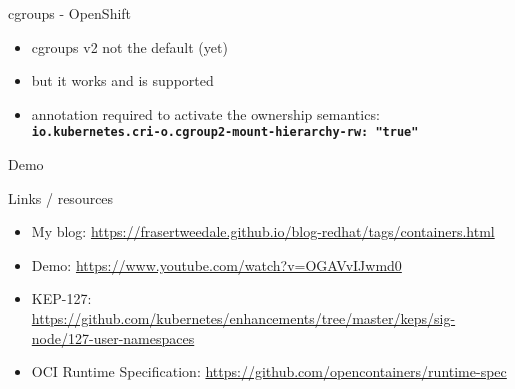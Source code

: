 \documentclass[ignorenonframetext,aspectratio=169,12pt]{beamer}
\begin{document}
\begin{frame}{cgroups - OpenShift}
\protect\hypertarget{openshift-cgroups-v2}{}
\begin{itemize}
\item cgroups v2 not the default (yet)
\item but it works and is supported
\item annotation required to activate the ownership semantics: \\
    \textbf{\texttt{io.kubernetes.cri-o.cgroup2-mount-hierarchy-rw: "true"}}
\end{itemize}
\end{frame}


\begin{frame}[plain]
\centering
\huge Demo
\end{frame}


\begin{frame}{Links / resources}
\protect\hypertarget{links}{}

\begin{itemize}
\item My blog: \url{https://frasertweedale.github.io/blog-redhat/tags/containers.html}
\item Demo: \url{https://www.youtube.com/watch?v=OGAVvIJwmd0}
\item KEP-127: \url{https://github.com/kubernetes/enhancements/tree/master/keps/sig-node/127-user-namespaces}
\item OCI Runtime Specification: \url{https://github.com/opencontainers/runtime-spec}
\end{itemize}

\end{frame}
\end{document}
